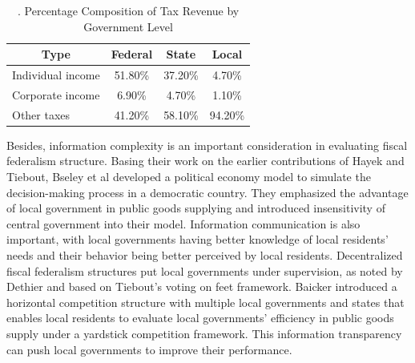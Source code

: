 \begin{table}[htbp]
    \centering
    \caption{. Percentage Composition of Tax Revenue by Government Level}
    \begin{tabular}{lccc}
        \toprule
        \multicolumn{1}{c}{Type} & Federal & State   & Local   \\
        \midrule
        Individual income        & 51.80\% & 37.20\% & 4.70\%  \\
        Corporate income         & 6.90\%  & 4.70\%  & 1.10\%  \\
        Other taxes              & 41.20\% & 58.10\% & 94.20\% \\
        \bottomrule
    \end{tabular}%
    \label{Table 1.2}%
\end{table}%


Besides, information complexity is an important consideration in evaluating fiscal federalism structure. Basing their work on the earlier contributions of Hayek and Tiebout, Bseley et al \cite{2003Centralized} developed a political economy model to simulate the decision-making process in a democratic country. They emphasized the advantage of local government in public goods supplying and introduced insensitivity of central government into their model. Information communication is also important, with local governments having better knowledge of local residents' needs and their behavior being better perceived by local residents. Decentralized fiscal federalism structures put local governments under supervision, as noted by Dethier \cite{martinez2003fiscal} and based on Tiebout's voting on feet framework. Baicker \cite{baicker2005spillover} introduced a horizontal competition structure with multiple local governments and states that enables local residents to evaluate local governments' efficiency in public goods supply under a yardstick competition framework. This information transparency can push local governments to improve their performance.

